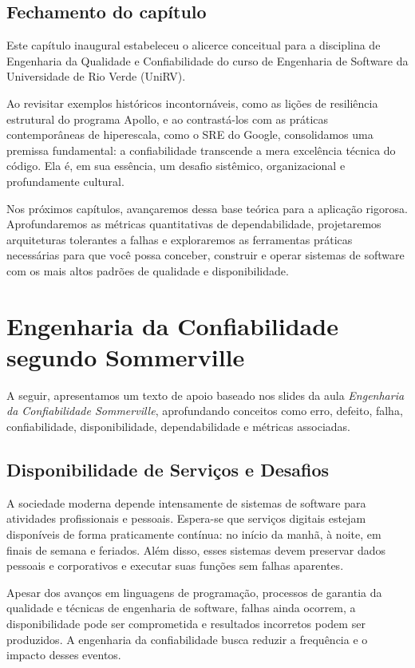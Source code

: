 \documentclass[12pt,a4paper,twoside]{report}
\begin{document}
\section{Fechamento do capítulo}
Este capítulo inaugural estabeleceu o alicerce conceitual para a disciplina de Engenharia da Qualidade e Confiabilidade do curso de Engenharia de Software da Universidade de Rio Verde (UniRV).

Ao revisitar exemplos históricos incontornáveis, como as lições de resiliência estrutural do programa Apollo, e ao contrastá-los com as práticas contemporâneas de hiperescala, como o SRE do Google, consolidamos uma premissa fundamental: a confiabilidade transcende a mera excelência técnica do código. Ela é, em sua essência, um desafio sistêmico, organizacional e profundamente cultural.

Nos próximos capítulos, avançaremos dessa base teórica para a aplicação rigorosa. Aprofundaremos as métricas quantitativas de dependabilidade, projetaremos arquiteturas tolerantes a falhas e exploraremos as ferramentas práticas necessárias para que você possa conceber, construir e operar sistemas de software com os mais altos padrões de qualidade e disponibilidade.

\clearpage

\chapter{Engenharia da Confiabilidade segundo Sommerville} \cite{sommerville2019}

A seguir, apresentamos um texto de apoio baseado nos slides da aula
\emph{Engenharia da Confiabilidade Sommerville}, aprofundando conceitos como
erro, defeito, falha, confiabilidade, disponibilidade, dependabilidade e
métricas associadas.

\section{Disponibilidade de Serviços e Desafios}

A sociedade moderna depende intensamente de sistemas de software para
atividades profissionais e pessoais. Espera-se que serviços digitais estejam
disponíveis de forma praticamente contínua: no início da manhã, à noite, em
finais de semana e feriados. Além disso, esses sistemas devem preservar
dados pessoais e corporativos e executar suas funções sem falhas aparentes.

Apesar dos avanços em linguagens de programação, processos de garantia da
qualidade e técnicas de engenharia de software, falhas ainda ocorrem, a
disponibilidade pode ser comprometida e resultados incorretos podem ser
produzidos. A engenharia da confiabilidade busca reduzir a frequência e o
impacto desses eventos.
\end{document}
